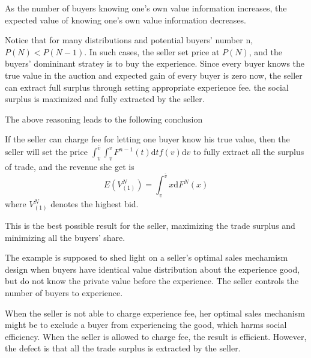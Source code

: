 \begin{lemma}
As the number of buyers knowing one's own value information increases, the expected value of knowing one's own value information decreases. 
\end{lemma}
Notice that for many distributions and potential buyers' number n, $P(N) < P(N-1)$. In such cases, the seller set price at $P(N)$, and 
the buyers' domininant stratey is to buy the experience. 
Since every buyer knows the true value in the auction and expected gain of every buyer is zero now, the seller can extract full surplus through setting appropriate experience fee. the 
social surplus is maximized and fully extracted by the seller. 



The above reasoning leads to the following conclusion

\begin{thm}

 If the seller can charge fee for letting one buyer know his true value, then the seller will set the price
 $ \int_{\underline{v}}^{\overline{v}}\int_{\underline{v}}^v F^{n-1}(t)\mathrm{d}tf(v)\mathrm{d}v$ to fully extract all the surplus of trade, and the revenue she get is 
 \begin{equation}
 E(V_{(1)}^N)=\int_{\underline{v}}^{\overline{v}} x\mathrm{d}F^N(x) 
 \end{equation}
where $V_{(1)}^N$ denotes the highest bid. 
\end{thm}
 This is the best possible result for the seller, maximizing the trade surplus and minimizing all the buyers' share. 


The example is supposed to shed light on a seller's optimal
sales mechamism design when buyers have identical value distribution about the
experience good, but do not know the private value before the experience. The seller controls the number of buyers to experience. 

When the seller is not able to charge experience fee, her optimal sales mechanism might be to exclude a buyer from experiencing the good, which harms social
 efficiency. When the seller is allowed to charge fee, the result is efficient. However, the defect is that
 all the trade surplus is extracted by the seller. 




 

 